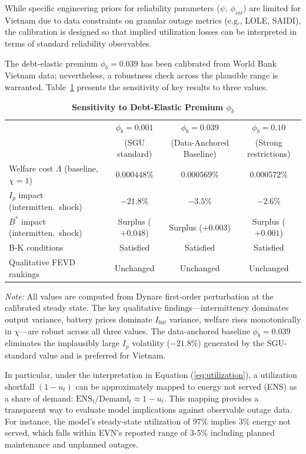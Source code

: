 \documentclass[12pt, a4paper]{article}
\begin{document}
While specific engineering priors for reliability parameters ($\psi$, $\phi_{int}$) are limited for Vietnam due to data constraints on granular outage metrics (e.g., LOLE, SAIDI), the calibration is designed so that implied utilization losses can be interpreted in terms of standard reliability observables.

The debt-elastic premium $\phi_b = 0.039$ has been calibrated from World Bank Vietnam data; nevertheless, a robustness check across the plausible range is warranted. Table~\ref{tab:phi_b_sensitivity} presents the sensitivity of key results to three values.

\begin{table}[H]
    \centering
    \caption{\textbf{Sensitivity to Debt-Elastic Premium $\phi_b$}}
    \label{tab:phi_b_sensitivity}
    \renewcommand{\arraystretch}{1.3}
    \small
    \begin{tabular}{l c c c}
        \toprule
        & $\phi_b = 0.001$ & $\phi_b = 0.039$ & $\phi_b = 0.10$ \\
        & (SGU standard) & (Data-Anchored Baseline) & (Strong restrictions) \\
        \midrule
        Welfare cost $\Lambda$ (baseline, $\chi=1$) & $0.000448\%$ & $0.000569\%$ & $0.000572\%$ \\
        $I_p$ impact (intermitten.\ shock) & $-21.8\%$ & $-3.5\%$ & $-2.6\%$ \\
        $B^*$ impact (intermitten.\ shock) & Surplus ($+0.048$) & Surplus ($+0.003$) & Surplus ($+0.001$) \\
        B-K conditions & Satisfied & Satisfied & Satisfied \\
        Qualitative FEVD rankings & Unchanged & Unchanged & Unchanged \\
        \bottomrule
    \end{tabular}
    \vspace{0.2cm}
    \parbox{\textwidth}{\footnotesize \textit{Note:} All values are computed from Dynare first-order perturbation at the calibrated steady state. The key qualitative findings---intermittency dominates output variance, battery prices dominate $I_{bat}$ variance, welfare rises monotonically in $\chi$---are robust across all three values. The data-anchored baseline $\phi_b = 0.039$ eliminates the implausibly large $I_p$ volatility ($-21.8\%$) generated by the SGU-standard value and is preferred for Vietnam.}
\end{table}

In particular, under the interpretation in Equation (\ref{eq:utilization}), a utilization shortfall $(1-u_t)$ can be approximately mapped to energy not served (ENS) as a share of demand: $\text{ENS}_t/\text{Demand}_t \approx 1-u_t$. This mapping provides a transparent way to evaluate model implications against observable outage data. For instance, the model's steady-state utilization of 97\% implies 3\% energy not served, which falls within EVN's reported range of 3-5\% including planned maintenance and unplanned outages.
\end{document}

